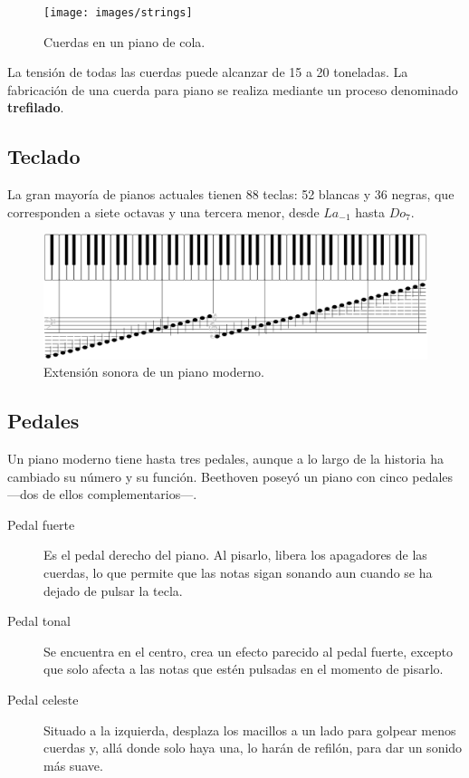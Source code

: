 \documentclass[10pt,a4paper]{article}
\begin{document}
	\begin{figure}[!ht]
		\centering
		\texttt{[image: images/strings]}
		\caption[Cuerdas en un piano]{\label{fig:strings} Cuerdas en un piano de cola.}
	\end{figure}
	
	La tensión de todas las cuerdas puede alcanzar de 15 a 20 toneladas. La 
	fabricación de una cuerda para piano se realiza mediante un proceso 
	denominado \textbf{trefilado}.
	
	\subsection{Teclado}
	
	La gran mayoría de pianos actuales tienen 88 teclas: 52 blancas y 36 
	negras, que corresponden a siete octavas y una tercera menor, desde 
	$La_{-1}$ hasta $Do_7$.
	
	\begin{figure}[!ht]
		\centering
		\includegraphics[width=\textwidth]{images/range}
		\caption[Extensión sonora]{\label{fig:range} Extensión sonora de un piano moderno.}
	\end{figure}
	
	\subsection{Pedales}
	
	Un piano moderno tiene hasta tres pedales, aunque a lo largo de la historia 
	ha cambiado su número y su función. Beethoven poseyó un piano con cinco 
	pedales ---dos de ellos complementarios---.
	
	\begin{description}
		\item[Pedal fuerte] Es el pedal derecho del piano. Al pisarlo, libera 
		los apagadores de las cuerdas, lo que permite que las notas sigan 
		sonando aun cuando se ha dejado de pulsar la tecla.
		
		\item[Pedal tonal] Se encuentra en el centro, crea un efecto parecido 
		al pedal fuerte, excepto que solo afecta a las notas que estén pulsadas 
		en el momento de pisarlo.
		
		\item[Pedal celeste] Situado a la izquierda, desplaza los macillos a un 
		lado para golpear menos cuerdas y, allá donde solo haya una, lo harán 
		de refilón, para dar un sonido más suave.
	\end{description}
	
\end{document}
